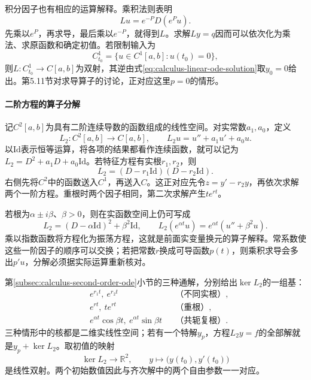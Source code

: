 积分因子也有相应的运算解释。乘积法则表明
\begin{equation*}
 Lu=e^{-P}D(e^Pu).
\end{equation*}
先乘以\(e^P\)，再求导，最后乘以\(e^{-P}\)，就得到\(L\)。求解\(Ly=q\)因而可以依次化为乘法、求原函数和确定初值。若限制输入为
\begin{equation*}
 C^1_{t_0}=\{u\in C^1[a,b]:u(t_0)=0\},
\end{equation*}
则\(L:C^1_{t_0}\to C[a,b]\)为双射，其逆由式\eqref{eq:calculus-linear-ode-solution}取\(y_0=0\)给出。第5.11节对求导算子的讨论，正对应这里\(p=0\)的情形。

\paragraph{二阶方程的算子分解} \mbox{}

记\(C^2[a,b]\)为具有二阶连续导数的函数组成的线性空间。对实常数\(a_1,a_0\)，定义
\begin{equation*}
 L_2:C^2[a,b]\to C[a,b],\qquad L_2u=u''+a_1u'+a_0u.
\end{equation*}
以\(\mathrm{Id}\)表示恒等运算，将各项的结果都看作连续函数，就可以记为\(L_2=D^2+a_1D+a_0\mathrm{Id}\)。若特征方程有实根\(r_1,r_2\)，则
\begin{equation*}
 L_2=(D-r_1\mathrm{Id})(D-r_2\mathrm{Id}).
\end{equation*}
右侧先将\(C^2\)中的函数送入\(C^1\)，再送入\(C\)。这正对应先令\(z=y'-r_2y\)，再依次求解两个一阶方程。重根时两个因子相同，第二次求解产生\(te^{rt}\)。

若根为\(\alpha\pm i\beta\)、\(\beta>0\)，则在实函数空间上仍可写成
\begin{equation*}
 L_2=(D-\alpha\mathrm{Id})^2+\beta^2\mathrm{Id},\qquad
 L_2(e^{\alpha t}u)=e^{\alpha t}(u''+\beta^2u).
\end{equation*}
乘以指数函数将方程化为振荡方程，这就是前面实变量换元的算子解释。常系数使这些一阶因子的顺序可以交换；若把常数\(r\)换成可导函数\(p(t)\)，则乘积求导会多出\(p'u\)，分解必须据实际运算重新核对。

第\ref{subsec:calculus-second-order-ode}小节的三种通解，分别给出\(\ker L_2\)的一组基：
\begin{equation*}
 \begin{aligned}
 &e^{r_1t},\ e^{r_2t}&&\text{（不同实根）},\\
 &e^{rt},\ te^{rt}&&\text{（重根）},\\
 &e^{\alpha t}\cos\beta t,\ e^{\alpha t}\sin\beta t
 &&\text{（共轭复根）}.
 \end{aligned}
\end{equation*}
三种情形中的核都是二维实线性空间；若有一个特解\(y_p\)，方程\(L_2y=f\)的全部解就是\(y_p+\ker L_2\)。取初值的映射
\begin{equation*}
 \ker L_2\longrightarrow\mathbb R^2,\qquad
 y\longmapsto\bigl(y(t_0),y'(t_0)\bigr)
\end{equation*}
是线性双射。两个初始数值因此与齐次解中的两个自由参数一一对应。

